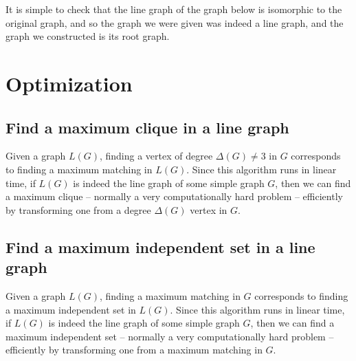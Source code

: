 \documentclass[11pt]{article}
\begin{document}
It is simple to check that the line graph of the graph below is isomorphic to the original graph, and so the graph we were given was indeed a line graph, and the graph we constructed is its root graph.


\section{Optimization}

\subsection{Find a maximum clique in a line graph}

Given a graph $L(G)$, finding a vertex of degree $\Delta(G)\neq3$ in $G$ corresponds to finding a maximum matching in $L(G)$.
Since this algorithm runs in linear time, if $L(G)$ is indeed the line graph of some simple graph $G$, then we can find a maximum clique -- normally a very computationally hard problem -- efficiently by transforming one from a degree $\Delta(G)$ vertex in $G$.


\subsection{Find a maximum independent set in a line graph}

Given a graph $L(G)$, finding a maximum matching in $G$ corresponds to finding a maximum independent set in $L(G)$.
Since this algorithm runs in linear time, if $L(G)$ is indeed the line graph of some simple graph $G$, then we can find a maximum independent set -- normally a very computationally hard problem -- efficiently by transforming one from a maximum matching in $G$.




\end{document}
